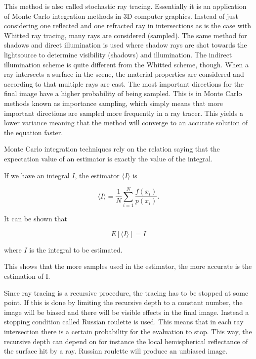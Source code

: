 \documentclass[a4paper]{report}
\begin{document}
This method is also called stochastic ray tracing. Essentially it is
an application of Monte Carlo integration methods in 3D computer
graphics. Instead of just considering one reflected and one refracted
ray in intersections as is the case with Whitted ray tracing, many
rays are considered (sampled). The same method for shadows and direct
illumination is used where shadow rays are shot towards the
lightsource to determine visibility (shadows) and illumination. The
indirect illumination scheme is quite different from the Whitted
scheme, though. When a ray intersects a surface in the scene, the
material properties are considered and according to that multiple rays
are cast. The most important directions for the final image have a
higher probability of being sampled. This is in Monte Carlo methods
known as importance sampling, which simply means that more important
directions are sampled more frequently in a ray tracer. This yields a
lower variance meaning that the method will converge to an accurate
solution of the equation faster.

Monte Carlo integration techniques rely on the relation saying that the expectation value
of an estimator is exactly the value of the integral.

If we have an integral \(I\), the estimator \(\langle I \rangle\) is

\begin{equation}
  \langle I \rangle = \frac{1}{N}\sum^N_{i=1}\frac{f(x_i)}{p(x_i)}.
  \label{eq:estimator}
\end{equation}

It can be shown that 

\begin{equation}
  E[\langle I \rangle] = I
\end{equation}

where \(I\) is the integral to be estimated.

This shows that the more samples used in the estimator, the more
accurate is the estimation of I.

Since ray tracing is a recursive procedure, the tracing has to be
stopped at some point. If this is done by limiting the recursive depth
to a constant number, the image will be biased and there will be
visible effects in the final image. Instead a stopping condition
called Russian roulette is used. This means that in each ray
intersection there is a certain probability for the evaluation to
stop. This way, the recursive depth can depend on for instance the
local hemispherical reflectance of the surface hit by a ray. Russian
roulette will produce an unbiased image.
\end{document}
